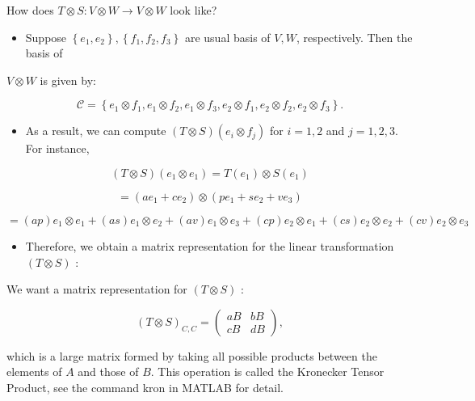 \documentclass[11pt]{article}
\begin{document}
How does \(T \otimes  S : V \otimes  W \rightarrow  V \otimes  W\) look like?

\begin{itemize}
\item Suppose \(\left\{  {{e}_1,{e}_2}\right\}  ,\left\{  {{f}_1,{f}_2,{f}_{3}}\right\}\) are usual basis of \(V,W\), respectively. Then the basis of
\end{itemize}

\(V \otimes  W\) is given by:

\[
\mathcal{C} = \left\{  {{e}_1 \otimes  {f}_1,{e}_1 \otimes  {f}_2,{e}_1 \otimes  {f}_{3},{e}_2 \otimes  {f}_1,{e}_2 \otimes  {f}_2,{e}_2 \otimes  {f}_{3}}\right\}  .
\]

\begin{itemize}
\item As a result, we can compute \(\left( {T \otimes  S}\right) \left( {{e}_{i} \otimes  {f}_{j}}\right)\) for \(i = 1,2\) and \(j = 1,2,3\). For instance,
\end{itemize}

\[
\left( {T \otimes  S}\right) \left( {{e}_1 \otimes  {e}_1}\right)  = T\left( {e}_1\right)  \otimes  S\left( {e}_1\right)
\]

\[
= \left( {a{e}_1 + c{e}_2}\right)  \otimes  \left( {p{e}_1 + s{e}_2 + v{e}_{3}}\right)
\]

\[
= \left( {ap}\right) {e}_1 \otimes  {e}_1 + \left( {as}\right) {e}_1 \otimes  {e}_2 + \left( {av}\right) {e}_1 \otimes  {e}_{3} + \left( {cp}\right) {e}_2 \otimes  {e}_1 + \left( {cs}\right) {e}_2 \otimes  {e}_2 + \left( {cv}\right) {e}_2 \otimes  {e}_{3}
\]

\begin{itemize}
\item Therefore, we obtain a matrix representation for the linear transformation \(\left( {T \otimes  S}\right)\) :
\end{itemize}

We want a matrix representation for \(\left( {T \otimes  S}\right)\) :

\[
{\left( T \otimes  S\right) }_{C,C} = \left( \begin{array}{ll} {aB} & {bB} \\  {cB} & {dB} \end{array}\right) ,
\]

which is a large matrix formed by taking all possible products between the elements of \(A\) and those of \(B\). This operation is called the Kronecker Tensor Product, see the command kron in MATLAB for detail.
\end{document}
